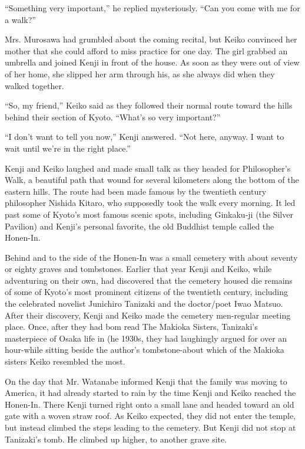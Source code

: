 \documentclass[]{article}
\begin{document}
{“Something very important,” he replied mysteriously. “Can you come with me for a walk?”

Mrs. Murosawa had grumbled about the coming recital, but Keiko convinced her mother that she could afford to miss practice for one day. The girl grabbed an umbrella and joined Kenji in front of the house. As soon as they were out of view of her home, she slipped her arm through his, as she always did when they walked together.

“So, my friend,” Keiko said as they followed their normal route toward the hills behind their section of Kyoto. “What’s so very important?”

“I don’t want to tell you now,” Kenji answered. “Not here, anyway. I want to wait until we’re in the right place.”

Kenji and Keiko laughed and made small talk as they headed for Philosopher’s Walk, a beautiful path that wound for several kilometers along the bottom of the eastern hills. The route had been made famous by the twentieth century philosopher Nishida Kitaro, who supposedly took the walk every morning. It led past some of Kyoto’s most famous scenic spots, including Ginkaku-ji (the Silver Pavilion) and Kenji’s personal favorite, the old Buddhist temple called the Honen-In.

Behind and to the side of the Honen-In was a small cemetery with about seventy or eighty graves and tombstones. Earlier that year Kenji and Keiko, while adventuring on their own, had discovered that the cemetery housed die remains of some of Kyoto’s most prominent citizens of the twentieth century, including the celebrated novelist Junichiro Tanizaki and the doctor/poet Iwao Matsuo. After their discovery, Kenji and Keiko made the cemetery men-regular meeting place. Once, after they had bom read The Makioka Sisters, Tanizaki’s masterpiece of Osaka life in (he 1930s, they had laughingly argued for over an hour-while sitting beside the author’s tombstone-about which of the Makioka sisters Keiko resembled the most.

On the day that Mr. Watanabe informed Kenji that the family was moving to America, it had already started to rain by the time Kenji and Keiko reached the Honen-In. There Kenji turned right onto a small lane and headed toward an old gate with a woven straw roof. As Keiko expected, they did not enter the temple, but instead climbed the steps leading to the cemetery. But Kenji did not stop at Tanizaki’s tomb. He climbed up higher, to another grave site.

}
\end{document}
